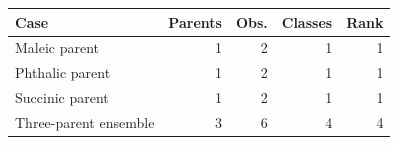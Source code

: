 \begin{tabular}{lrrrr}
\toprule
Case & Parents & Obs. & Classes & Rank \\
\midrule
Maleic parent & 1 & 2 & 1 & 1 \\
Phthalic parent & 1 & 2 & 1 & 1 \\
Succinic parent & 1 & 2 & 1 & 1 \\
Three-parent ensemble & 3 & 6 & 4 & 4 \\
\bottomrule
\end{tabular}
